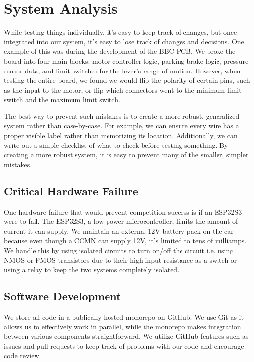 \section{System Analysis}

While testing things individually, it's easy to keep track of changes,
but once integrated into our system, it's easy to lose track of changes
and decisions. One example of this was during the development of the
BBC PCB. We broke the board into four main blocks: motor controller
logic, parking brake logic, pressure sensor data, and limit switches
for the lever's range of motion. However, when testing the entire
board, we found we would flip the polarity of certain pins, such as the
input to the motor, or flip which connectors went to the minimum limit
switch and the maximum limit switch.

The best way to prevent such mistakes is to create a more robust,
generalized system rather than case-by-case. For example, we can ensure
every wire has a proper visible label rather than memorizing its
location. Additionally, we can write out a simple checklist of what to
check before testing something. By creating a more robust system, it is
easy to prevent many of the smaller, simpler mistakes.

\subsection{Critical Hardware Failure}

One hardware failure that would prevent competition success is if an
ESP32S3 were to fail. The ESP32S3, a low-power microcontroller, limits
the amount of current it can supply. We maintain an external 12V
battery pack on the car because even though a CCMN can supply 12V, it's
limited to tens of milliamps. We handle this by using isolated circuits
to turn on/off the circuit i.e. using NMOS or PMOS transistors due to
their high input resistance as a switch or using a relay to keep the
two systems completely isolated.

\subsection{Software Development}

We store all code in a publically hosted monorepo on GitHub. We use Git
as it allows us to effectively work in parallel, while the monorepo
makes integration between various components straightforward. We
utilize GitHub features such as issues and pull requests to keep track
of problems with our code and encourage code review.

